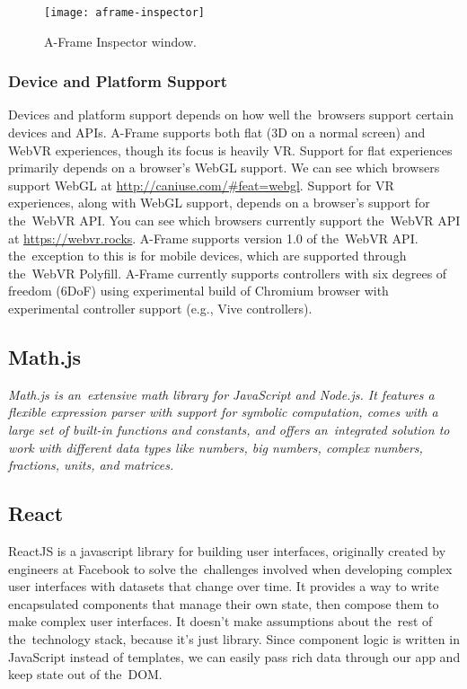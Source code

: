 \begin{figure}[ht!]
\centering
\texttt{[image: aframe-inspector]}
\caption{A-Frame Inspector window.}
\label{r:41}
\end{figure}

\subsubsection{Device and Platform Support}
Devices and platform support depends on how well the~browsers support certain devices and APIs. A-Frame supports both flat (3D on a normal screen) and WebVR experiences, though its focus is heavily VR. Support for flat experiences primarily depends on a browser’s WebGL support. We can see which browsers support WebGL at \url{http://caniuse.com/#feat=webgl}. Support for VR experiences, along with WebGL support, depends on a browser’s support for the~WebVR API. You can see which browsers currently support the~WebVR API at \url{https://webvr.rocks}. A-Frame supports version 1.0 of the~WebVR API. the~exception to this is for mobile devices, which are supported through the~WebVR Polyfill. A-Frame currently supports controllers with six degrees of freedom (6DoF) using experimental build of Chromium browser with experimental controller support (e.g., Vive controllers). \cite{aframe-intro}

\subsection{Math.js}
\textsl{Math.js is an~extensive math library for JavaScript and Node.js. It features a flexible expression parser with support for symbolic computation, comes with a large set of built-in functions and constants, and offers an~integrated solution to work with different data types like numbers, big numbers, complex numbers, fractions, units, and matrices.} \cite{mathjs}

\subsection{React}
ReactJS is a javascript library for building user interfaces, originally created by engineers at Facebook to solve the~challenges involved when developing complex user interfaces with datasets that change over time. It provides a way to write encapsulated components that manage their own state, then compose them to make complex user interfaces. It doesn't make assumptions about the~rest of the~technology stack, because it’s just library. Since component logic is written in JavaScript instead of templates, we can easily pass rich data through our app and keep state out of the~DOM. \cite{gackenheimer}

